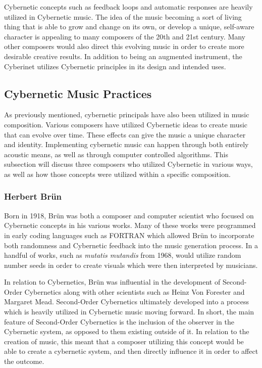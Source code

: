 Cybernetic concepts such as feedback loops and automatic responses are heavily utilized in Cybernetic music. The idea of the music becoming a sort of living thing that is able to grow and change on its own, or develop a unique, self-aware character is appealing to many composers of the 20th and 21st century. Many other composers would also direct this evolving music in order to create more desirable creative results. In addition to being an augmented instrument, the Cyberinet utilizes Cybernetic principles in its design and intended uses. 



\subsection{Cybernetic Music Practices}
As previously mentioned, cybernetic principals have also been utilized in music composition. Various composers have utilized Cybernetic ideas to create music that can evolve over time. These effects can give the music a unique character and identity. Implementing cybernetic music can happen through both entirely acoustic means, as well as through computer controlled algorithms. This subsection will discuss three composers who utilized Cybernetic in various ways, as well as how those concepts were utilized within a specific composition.


\subsubsection{Herbert Brün} %

Born in 1918, Brün was both a composer and computer scientist who focused on Cybernetic concepts in his various works. Many of these works were programmed in early coding languages such as FORTRAN which allowed Brün to incorporate both randomness and Cybernetic feedback into the music generation process. In a handful of works, such as \textit{mutatis mutandis} from 1968, would utilize random number seeds in order to create visuals which were then interpreted by musicians.

In relation to Cybernetics, Brün was influential in the development of Second-Order Cybernetics along with other scientists such as Heinz Von Forester and Margaret Mead. Second-Order Cybernetics ultimately developed into a process which is heavily utilized in Cybernetic music moving forward. In short, the main feature of Second-Order Cybernetics is the inclusion of the observer in the Cybernetic system, as opposed to them existing outside of it\cite{Scott_2nd_order_Cyber}. In relation to the creation of music, this meant that a composer utilizing this concept would be able to create a cybernetic system, and then directly influence it in order to affect the outcome.


